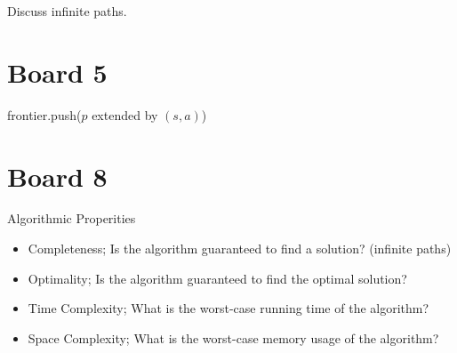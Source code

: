 \documentclass[10pt]{article}
\begin{document}
Discuss infinite paths. 

\section{Board 5}

\begin{algorithm}
\begin{algorithmic}[1]
  \EndIf{}
  frontier.push($p$ extended by $(s,a)$)
  \EndIf{}
  \EndFor{}
  \EndWhile{}
  \EndProcedure{}
\end{algorithmic}
\end{algorithm}




\section{Board 8}

Algorithmic Properities


\begin{itemize}
\item Completeness; Is the algorithm guaranteed to find a solution? (infinite paths)
\item Optimality; Is the algorithm guaranteed to find the optimal solution?
\item Time Complexity; What is the worst-case running time of the algorithm?
\item Space Complexity; What is the worst-case memory usage of the algorithm?
\end{itemize}
\end{document}
